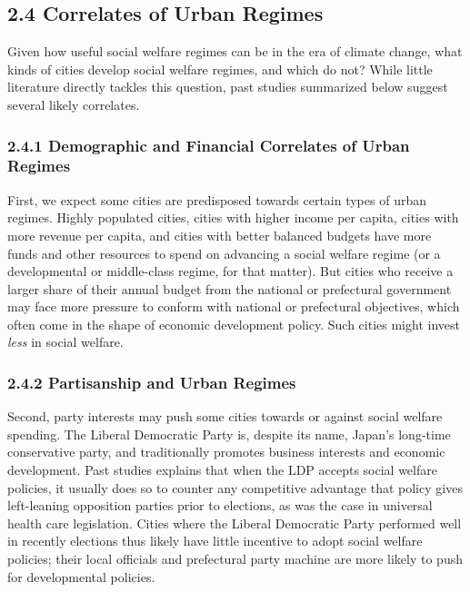 \documentclass[preprint, 3p,
authoryear]{elsarticle} %
\begin{document}
\hypertarget{correlates-of-urban-regimes}{%
\subsection{2.4 Correlates of Urban
Regimes}\label{correlates-of-urban-regimes}}

Given how useful social welfare regimes can be in the era of climate
change, what kinds of cities develop social welfare regimes, and which
do not? While little literature directly tackles this question, past
studies summarized below suggest several likely correlates.

\hypertarget{demographic-and-financial-correlates-of-urban-regimes}{%
\subsubsection{2.4.1 Demographic and Financial Correlates of Urban
Regimes}\label{demographic-and-financial-correlates-of-urban-regimes}}

First, we expect some cities are predisposed towards certain types of
urban regimes. Highly populated cities, cities with higher income per
capita, cities with more revenue per capita, and cities with better
balanced budgets have more funds and other resources to spend on
advancing a social welfare regime (or a developmental or middle-class
regime, for that matter). But cities who receive a larger share of their
annual budget from the national or prefectural government may face more
pressure to conform with national or prefectural objectives, which often
come in the shape of economic development policy. Such cities might
invest \emph{less} in social welfare.

\hypertarget{partisanship-and-urban-regimes}{%
\subsubsection{2.4.2 Partisanship and Urban
Regimes}\label{partisanship-and-urban-regimes}}

Second, party interests may push some cities towards or against social
welfare spending. The Liberal Democratic Party is, despite its name,
Japan's long-time conservative party, and traditionally promotes
business interests and economic development. Past studies explains that
when the LDP accepts social welfare policies, it usually does so to
counter any competitive advantage that policy gives left-leaning
opposition parties prior to elections, as was the case in universal
health care legislation. Cities where the Liberal Democratic Party
performed well in recently elections thus likely have little incentive
to adopt social welfare policies; their local officials and prefectural
party machine are more likely to push for developmental policies.
\end{document}
